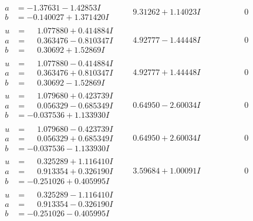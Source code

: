 \documentclass[1p]{elsarticle_modified}
\theoremstyle{definition}
\begin{document}
$$\begin{array}{c|c|c}
\begin{aligned}
a &= -1.37631 - 1.42853 I \\
b &= -0.140027 + 1.371420 I\end{aligned}
 & \phantom{-}9.31262 + 1.14023 I & \phantom{-0.000000 } 0 \\ \hline\begin{aligned}
u &= \phantom{-}1.077880 + 0.414884 I \\
a &= \phantom{-}0.363476 - 0.810347 I \\
b &= \phantom{-}0.30692 + 1.52869 I\end{aligned}
 & \phantom{-}4.92777 - 1.44448 I & \phantom{-0.000000 } 0 \\ \hline\begin{aligned}
u &= \phantom{-}1.077880 - 0.414884 I \\
a &= \phantom{-}0.363476 + 0.810347 I \\
b &= \phantom{-}0.30692 - 1.52869 I\end{aligned}
 & \phantom{-}4.92777 + 1.44448 I & \phantom{-0.000000 } 0 \\ \hline\begin{aligned}
u &= \phantom{-}1.079680 + 0.423739 I \\
a &= \phantom{-}0.056329 - 0.685349 I \\
b &= -0.037536 + 1.133930 I\end{aligned}
 & \phantom{-}0.64950 - 2.60034 I & \phantom{-0.000000 } 0 \\ \hline\begin{aligned}
u &= \phantom{-}1.079680 - 0.423739 I \\
a &= \phantom{-}0.056329 + 0.685349 I \\
b &= -0.037536 - 1.133930 I\end{aligned}
 & \phantom{-}0.64950 + 2.60034 I & \phantom{-0.000000 } 0 \\ \hline\begin{aligned}
u &= \phantom{-}0.325289 + 1.116410 I \\
a &= \phantom{-}0.913354 + 0.326190 I \\
b &= -0.251026 + 0.405995 I\end{aligned}
 & \phantom{-}3.59684 + 1.00091 I & \phantom{-0.000000 } 0 \\ \hline\begin{aligned}
u &= \phantom{-}0.325289 - 1.116410 I \\
a &= \phantom{-}0.913354 - 0.326190 I \\
b &= -0.251026 - 0.405995 I\end{aligned}

\end{array}$$
\end{document}
